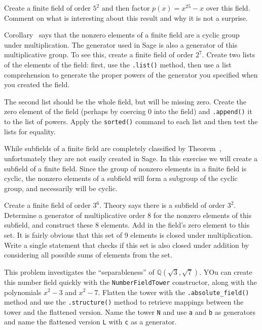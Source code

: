 \begin{sageverbatim}\end{sageverbatim}
%
%
Create a finite field of order $5^2$ and then factor $p(x)=x^{25}-x$ over this field.  Comment on what is interesting about this result and why it is not a surprise.
\begin{sageverbatim}\end{sageverbatim}
%
%
Corollary~ says that the nonzero elements of a finite field are a cyclic group under multiplication.  The generator used in Sage is also a generator of this multiplicative group.  To see this, create a finite field of order $2^7$.  Create two lists of the elements of the field: first, use the \verb?.list()? method, then use a list comprehension to generate the proper powers of the generator you specified when you created the field.\par
%
The second list should be the whole field, but will be missing zero.  Create the zero element of the field (perhaps by coercing 0 into the field) and \verb?.append()? it to the list of powers.  Apply the \verb?sorted()? command to each list and then test the lists for equality.
\begin{sageverbatim}\end{sageverbatim}
%
%
While subfields of a finite field are completely classified by Theorem~, unfortunately they are not easily created in Sage.  In this exercise we will create a subfield of a finite field.  Since the group of nonzero elements in a finite field is cyclic, the nonzero elements of a subfield will form a subgroup of the cyclic group, and necessarily will be cyclic.\par
%
Create a finite field of order $3^6$.  Theory says there is a subfield of order $3^2$.  Determine a generator of multiplicative order 8 for the nonzero elements of this subfield, and construct these 8 elements.  Add in the field's zero element to this set.  It is fairly obvious that this set of 9 elements is closed under multiplication.  Write a single statement that checks if this set is also closed under addition by considering all possible sums of elements from the set.
\begin{sageverbatim}\end{sageverbatim}
%
%
This problem investigates the ``separableness'' of ${\mathbb Q}(\sqrt{3},\sqrt{7})$.  YOu can create this number field quickly with the \verb?NumberFieldTower? constructor, along with the polynomials $x^2-3$ and $x^2-7$.  Flatten the tower with the \verb?.absolute_field()? method and use the \verb?.structure()? method to retrieve mappings between the tower and the flattened version.  Name the tower \verb?N? and use \verb?a? and \verb?b? as generators and name the flattened version \verb?L? with \verb?c? as a generator.\par
